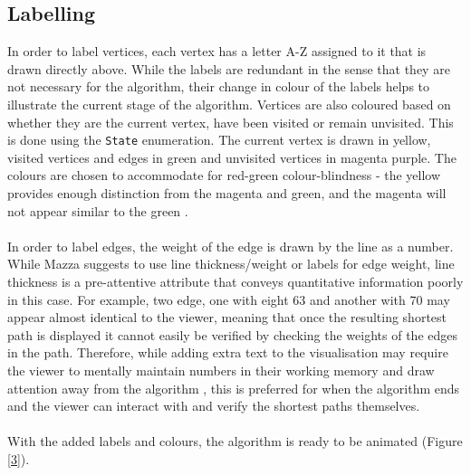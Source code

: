 \documentclass[11pt,a4paper]{article}
\begin{document}
\subsection*{Labelling}

In order to label vertices, each vertex has a letter A-Z assigned to it that is drawn directly above.
While the labels are redundant in the sense that they are not necessary for the algorithm, their change in colour of the
labels helps to illustrate the current stage of the algorithm.
Vertices are also coloured based on whether they are the current vertex, have been visited or remain unvisited. This is done
using the \texttt{State} enumeration. The current vertex is drawn in yellow, visited vertices and edges in green and
unvisited vertices in magenta purple. The colours are chosen to accommodate for red-green colour-blindness - the yellow provides 
enough distinction from the magenta and green, and the magenta will not appear similar to the green \cite{wong2011points}.
\\
\\
In order to label edges, the weight of the edge is drawn by the line as a number. While Mazza \cite{mazza2009introduction}
suggests to use line thickness/weight or labels for edge weight, line thickness is a pre-attentive attribute that conveys
quantitative information poorly in this case. For example, two edge, one with eight 63 and another with 70 may appear almost
identical to the viewer, meaning that once the resulting shortest path is displayed it cannot easily be verified by checking
the weights of the edges in the path. Therefore, while adding extra text to the visualisation may require the viewer
to mentally maintain numbers in their working memory and draw attention away from the algorithm \cite{tufte}, this is preferred
for when the algorithm ends and the viewer can interact with and verify the shortest paths themselves.
\\
\\
With the added labels and colours, the algorithm is ready to be animated (Figure \ref{3}).
\end{document}
